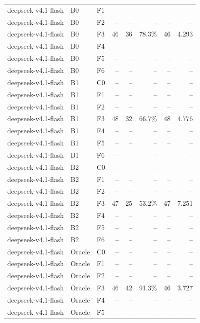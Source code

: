 \begin{tabular}{lllrrrrr}
deepseek-v4.1-flash & B0 & F1 & -- & -- & -- & -- & -- \\
deepseek-v4.1-flash & B0 & F2 & -- & -- & -- & -- & -- \\
deepseek-v4.1-flash & B0 & F3 & 46 & 36 & 78.3\% & 46 & 4.293 \\
deepseek-v4.1-flash & B0 & F4 & -- & -- & -- & -- & -- \\
deepseek-v4.1-flash & B0 & F5 & -- & -- & -- & -- & -- \\
deepseek-v4.1-flash & B0 & F6 & -- & -- & -- & -- & -- \\
deepseek-v4.1-flash & B1 & C0 & -- & -- & -- & -- & -- \\
deepseek-v4.1-flash & B1 & F1 & -- & -- & -- & -- & -- \\
deepseek-v4.1-flash & B1 & F2 & -- & -- & -- & -- & -- \\
deepseek-v4.1-flash & B1 & F3 & 48 & 32 & 66.7\% & 48 & 4.776 \\
deepseek-v4.1-flash & B1 & F4 & -- & -- & -- & -- & -- \\
deepseek-v4.1-flash & B1 & F5 & -- & -- & -- & -- & -- \\
deepseek-v4.1-flash & B1 & F6 & -- & -- & -- & -- & -- \\
deepseek-v4.1-flash & B2 & C0 & -- & -- & -- & -- & -- \\
deepseek-v4.1-flash & B2 & F1 & -- & -- & -- & -- & -- \\
deepseek-v4.1-flash & B2 & F2 & -- & -- & -- & -- & -- \\
deepseek-v4.1-flash & B2 & F3 & 47 & 25 & 53.2\% & 47 & 7.251 \\
deepseek-v4.1-flash & B2 & F4 & -- & -- & -- & -- & -- \\
deepseek-v4.1-flash & B2 & F5 & -- & -- & -- & -- & -- \\
deepseek-v4.1-flash & B2 & F6 & -- & -- & -- & -- & -- \\
deepseek-v4.1-flash & Oracle & C0 & -- & -- & -- & -- & -- \\
deepseek-v4.1-flash & Oracle & F1 & -- & -- & -- & -- & -- \\
deepseek-v4.1-flash & Oracle & F2 & -- & -- & -- & -- & -- \\
deepseek-v4.1-flash & Oracle & F3 & 46 & 42 & 91.3\% & 46 & 3.727 \\
deepseek-v4.1-flash & Oracle & F4 & -- & -- & -- & -- & -- \\
deepseek-v4.1-flash & Oracle & F5 & -- & -- & -- & -- & -- \\

\end{tabular}
